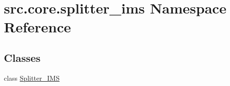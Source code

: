 \hypertarget{namespacesrc_1_1core_1_1splitter__ims}{}\section{src.\+core.\+splitter\+\_\+ims Namespace Reference}
\label{namespacesrc_1_1core_1_1splitter__ims}
\subsection*{Classes}
\begin{DoxyCompactItemize}
\item 
class \hyperlink{classsrc_1_1core_1_1splitter__ims_1_1Splitter__IMS}{Splitter\+\_\+\+I\+M\+S}
\end{DoxyCompactItemize}
